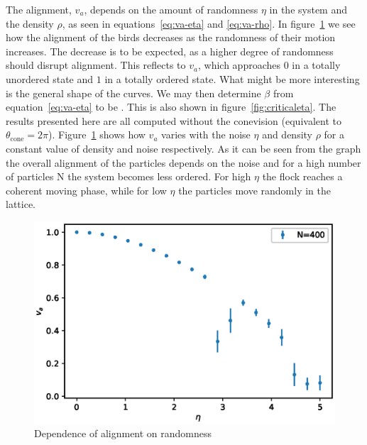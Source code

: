 \documentclass[twoside,twocolumn]{article}
\begin{document}
The alignment, $v_a$, depends on the amount of randomness $\eta$ in the system 
and the density $\rho$, as seen in equations~\eqref{eq:va-eta} and 
\eqref{eq:va-rho}. In figure~\ref{fig:va_over_eta} we see how the alignment of 
the birds decreases as the randomness of their motion increases. The decrease 
is to be expected, as a higher degree of randomness should disrupt alignment. 
This reflects to $v_a$, which approaches $0$ in a totally unordered state and $1$
in a totally ordered state.
What might be more interesting is the general shape of the curves. We may then 
determine $\beta$ from equation~\eqref{eq:va-eta} to be  . 
This is also shown in figure~\ref{fig:criticaleta}. The results presented here 
are all computed without the conevision (equivalent to $\theta_{\text{cone}} = 2\pi$). 
Figure~\ref{fig:va_over_eta} shows how $v_a$ varies with the noise $\eta$ and 
density $\rho$ for a constant value of density and noise respectively.
As it can be seen from the graph the overall alignment of the particles depends 
on the noise and for a high number of particles N the system becomes less ordered. 
For high $\eta$ the flock reaches a coherent moving phase, while for low $\eta$ 
the particles move randomly in the lattice.  





\begin{figure}[!htb]
  \centering
  \includegraphics[width=\columnwidth]{va_over_eta}
  \caption{Dependence of alignment on randomness}
  \label{fig:va_over_eta}
\end{figure}
\end{document}
